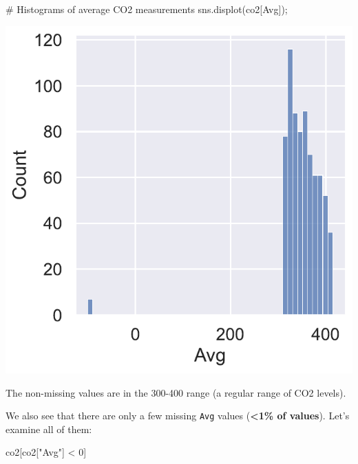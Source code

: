 \documentclass[
  letterpaper,
  DIV=11,
  numbers=noendperiod]{scrreprt}
\newenvironment{Shaded}{\begin{snugshade}}{\end{snugshade}}
\newcommand{\CommentTok}[1]{\textcolor[rgb]{0.37,0.37,0.37}{#1}}
\newcommand{\DecValTok}[1]{\textcolor[rgb]{0.68,0.00,0.00}{#1}}
\newcommand{\NormalTok}[1]{\textcolor[rgb]{0.00,0.23,0.31}{#1}}
\newcommand{\OperatorTok}[1]{\textcolor[rgb]{0.37,0.37,0.37}{#1}}
\newcommand{\StringTok}[1]{\textcolor[rgb]{0.13,0.47,0.30}{#1}}
\begin{document}
\begin{Shaded}
\begin{Highlighting}[]
\CommentTok{\# Histograms of average CO2 measurements}
\NormalTok{sns.displot(co2[}\StringTok{\textquotesingle{}Avg\textquotesingle{}}\NormalTok{])}\OperatorTok{;}
\end{Highlighting}
\end{Shaded}

\includegraphics{eda/eda_files/figure-pdf/cell-69-output-1.pdf}

The non-missing values are in the 300-400 range (a regular range of CO2
levels).

We also see that there are only a few missing \texttt{Avg} values
(\textbf{\textless1\% of values}). Let's examine all of them:

\begin{Shaded}
\begin{Highlighting}[]
\NormalTok{co2[co2[}\StringTok{"Avg"}\NormalTok{] }\OperatorTok{\textless{}} \DecValTok{0}\NormalTok{]}
\end{Highlighting}
\end{Shaded}
\end{document}
